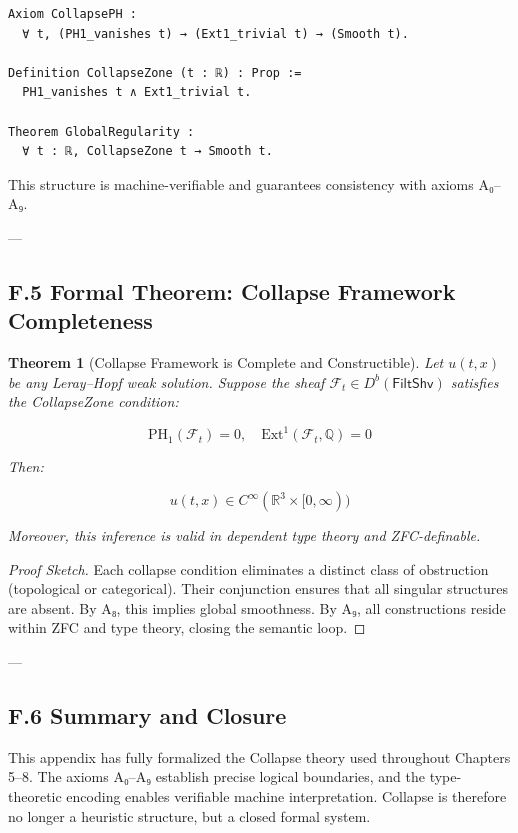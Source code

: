 \documentclass[11pt]{article}
\newtheorem{theorem}{Theorem}[section]
\begin{document}
{\begin{lstlisting}[language=Coq, caption=Collapse Type Structure in Coq]
Axiom CollapsePH :
  ∀ t, (PH1_vanishes t) → (Ext1_trivial t) → (Smooth t).

Definition CollapseZone (t : ℝ) : Prop :=
  PH1_vanishes t ∧ Ext1_trivial t.

Theorem GlobalRegularity :
  ∀ t : ℝ, CollapseZone t → Smooth t.
\end{lstlisting}

This structure is machine-verifiable and guarantees consistency with axioms A₀–A₉.

---

\subsection*{F.5 Formal Theorem: Collapse Framework Completeness}

\begin{theorem}[Collapse Framework is Complete and Constructible]
Let \( u(t,x) \) be any Leray–Hopf weak solution.  
Suppose the sheaf \( \mathcal{F}_t \in D^b(\mathsf{FiltShv}) \) satisfies the CollapseZone condition:

\[
\mathrm{PH}_1(\mathcal{F}_t) = 0, \quad \mathrm{Ext}^1(\mathcal{F}_t, \mathbb{Q}) = 0
\]

Then:

\[
u(t,x) \in C^\infty(\mathbb{R}^3 \times [0,\infty))
\]

Moreover, this inference is valid in dependent type theory and ZFC-definable.
\end{theorem}

\begin{proof}[Proof Sketch]
Each collapse condition eliminates a distinct class of obstruction (topological or categorical).  
Their conjunction ensures that all singular structures are absent.  
By A₈, this implies global smoothness.  
By A₉, all constructions reside within ZFC and type theory, closing the semantic loop.
\end{proof}

---

\subsection*{F.6 Summary and Closure}

This appendix has fully formalized the Collapse theory used throughout Chapters 5–8.  
The axioms A₀–A₉ establish precise logical boundaries,  
and the type-theoretic encoding enables verifiable machine interpretation.  
Collapse is therefore no longer a heuristic structure, but a closed formal system.

}
\end{document}
